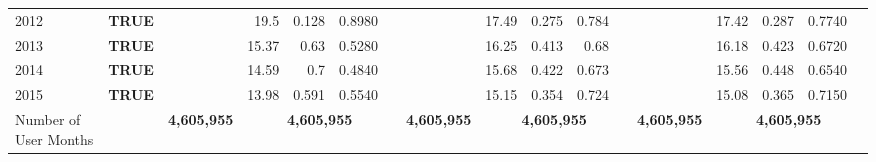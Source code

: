 \documentclass[letterpaper]{article}
\begin{document}
\begin{table}
\begin{threeparttable}
\begin{adjustbox}{max width=\textwidth}
\begin{tabular}{|p{3.75cm}|c|cccc|cccc|cccc|cccc|cccc|cccc|}
    2012 & \multicolumn{1}{l|}{\textbf{TRUE}} & \multicolumn{1}{r|}{} & \multicolumn{1}{r|}{} & \multicolumn{1}{r|}{} &       & \multicolumn{1}{r|}{19.5} & \multicolumn{1}{r|}{0.128} & \multicolumn{1}{r|}{0.8980} &       & \multicolumn{1}{r|}{} & \multicolumn{1}{r|}{} & \multicolumn{1}{r|}{} &       & \multicolumn{1}{r|}{17.49} & \multicolumn{1}{r|}{0.275} & \multicolumn{1}{r|}{0.784} &       & \multicolumn{1}{r|}{} & \multicolumn{1}{r|}{} & \multicolumn{1}{r|}{} &       & \multicolumn{1}{r|}{17.42} & \multicolumn{1}{r|}{0.287} & \multicolumn{1}{r|}{0.7740} &  \\
    2013 & \multicolumn{1}{l|}{\textbf{TRUE}} & \multicolumn{1}{r|}{} & \multicolumn{1}{r|}{} & \multicolumn{1}{r|}{} &       & \multicolumn{1}{r|}{15.37} & \multicolumn{1}{r|}{0.63} & \multicolumn{1}{r|}{0.5280} &       & \multicolumn{1}{r|}{} & \multicolumn{1}{r|}{} & \multicolumn{1}{r|}{} &       & \multicolumn{1}{r|}{16.25} & \multicolumn{1}{r|}{0.413} & \multicolumn{1}{r|}{0.68} &       & \multicolumn{1}{r|}{} & \multicolumn{1}{r|}{} & \multicolumn{1}{r|}{} &       & \multicolumn{1}{r|}{16.18} & \multicolumn{1}{r|}{0.423} & \multicolumn{1}{r|}{0.6720} &  \\
    2014 & \multicolumn{1}{l|}{\textbf{TRUE}} & \multicolumn{1}{r|}{} & \multicolumn{1}{r|}{} & \multicolumn{1}{r|}{} &       & \multicolumn{1}{r|}{14.59} & \multicolumn{1}{r|}{0.7} & \multicolumn{1}{r|}{0.4840} &       & \multicolumn{1}{r|}{} & \multicolumn{1}{r|}{} & \multicolumn{1}{r|}{} &       & \multicolumn{1}{r|}{15.68} & \multicolumn{1}{r|}{0.422} & \multicolumn{1}{r|}{0.673} &       & \multicolumn{1}{r|}{} & \multicolumn{1}{r|}{} & \multicolumn{1}{r|}{} &       & \multicolumn{1}{r|}{15.56} & \multicolumn{1}{r|}{0.448} & \multicolumn{1}{r|}{0.6540} &  \\
    2015 & \multicolumn{1}{l|}{\textbf{TRUE}} & \multicolumn{1}{r|}{} & \multicolumn{1}{r|}{} & \multicolumn{1}{r|}{} &       & \multicolumn{1}{r|}{13.98} & \multicolumn{1}{r|}{0.591} & \multicolumn{1}{r|}{0.5540} &       & \multicolumn{1}{r|}{} & \multicolumn{1}{r|}{} & \multicolumn{1}{r|}{} &       & \multicolumn{1}{r|}{15.15} & \multicolumn{1}{r|}{0.354} & \multicolumn{1}{r|}{0.724} &       & \multicolumn{1}{r|}{} & \multicolumn{1}{r|}{} & \multicolumn{1}{r|}{} &       & \multicolumn{1}{r|}{15.08} & \multicolumn{1}{r|}{0.365} & \multicolumn{1}{r|}{0.7150} &  \\\hline
    Number of User Months &       & \multicolumn{4}{c|}{\textbf{4,605,955}} & \multicolumn{4}{c|}{\textbf{4,605,955}} & \multicolumn{4}{c|}{\textbf{4,605,955}} & \multicolumn{4}{c|}{\textbf{4,605,955}} & \multicolumn{4}{c|}{\textbf{4,605,955}} & \multicolumn{4}{c|}{\textbf{4,605,955}} \\\hline

\end{tabular}
\end{adjustbox}
\end{threeparttable}
\end{table}
\end{document}
